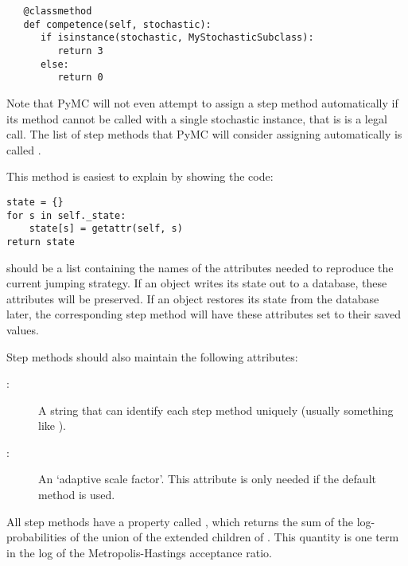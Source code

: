 \begin{description}
\begin{verbatim}
   @classmethod
   def competence(self, stochastic):
      if isinstance(stochastic, MyStochasticSubclass):
         return 3
      else:
         return 0
\end{verbatim}
   Note that PyMC will not even attempt to assign a step method automatically if its  method cannot be called with a single stochastic instance, that is  is a legal call. The list of step methods that PyMC will consider assigning automatically is called .
   \item[\code{current_state()}:] This method is easiest to explain by showing the code:
   \begin{verbatim}
state = {}
for s in self._state:
    state[s] = getattr(self, s)
return state
   \end{verbatim}
    should be a list containing the names of the attributes needed to reproduce the current jumping strategy. If an  object writes its state out to a database, these attributes will be preserved. If an  object restores its state from the database later, the corresponding step method will have these attributes set to their saved values.
\end{description}

Step methods should also maintain the following attributes:
\begin{description}
   \item[:] A string that can identify each step method uniquely (usually something like ).
   \item[:] An `adaptive scale factor'. This attribute is only needed if the default  method is used.
\end{description}

All step methods have a property called , which returns the sum of the log-probabilities of the union of the extended children of . This quantity is one term in the log of the Metropolis-Hastings acceptance ratio.


\hypertarget{user-metro}{}
